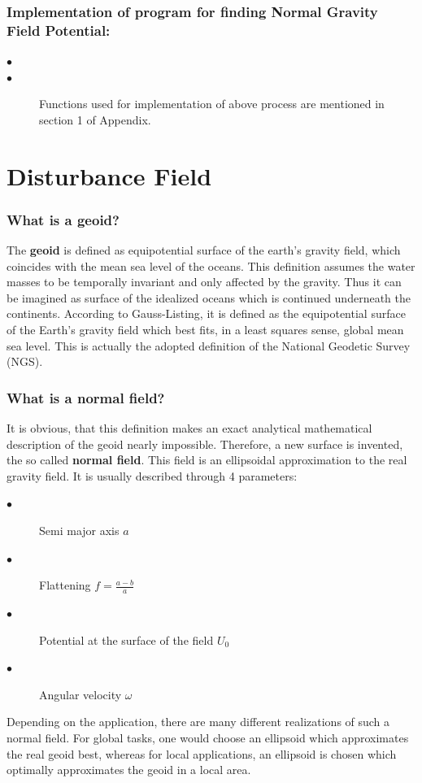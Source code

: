 \documentclass[a4paper,12pt]{report}
\begin{document}
\subsection{Implementation of program for finding Normal Gravity Field Potential:}
\begin{description}
\item[$\bullet$]
\item[$\bullet$]Functions used for implementation of above process are mentioned in section 1 of Appendix.
\end{description}   

\newpage
\chapter{Disturbance Field}
\subsection{What is a  geoid?}
The \textbf{geoid} is defined as equipotential surface of the earth’s gravity field, which coincides with the mean sea level of the oceans. This definition assumes the water masses to be temporally invariant and only affected by the gravity. Thus it can be imagined as surface of the idealized oceans which is continued underneath the continents. According to Gauss-Listing, it is defined as the equipotential surface of the Earth’s gravity field which best fits, in a least squares sense, global mean sea level. This is actually the adopted definition of the National Geodetic Survey (NGS).\\

\subsection{What is a normal field?}
It is obvious, that this definition makes an exact analytical mathematical description of the geoid nearly impossible. Therefore, a new surface is invented, the so called \textbf{normal field}. This field is an ellipsoidal approximation to the real gravity field. It is usually described through 4 parameters:
\begin{description}
\item[$\bullet$]Semi major axis $a$
\item[$\bullet$]Flattening $f=\frac{a-b}{a}$
\item[$\bullet$]Potential at the surface of the field $U_0$
\item[$\bullet$]Angular velocity $\omega$
\end{description}
Depending on the application, there are many different realizations of such a normal field. For global tasks, one would choose an ellipsoid which approximates the real geoid
best, whereas for local applications, an ellipsoid is chosen which optimally approximates the geoid in a local area.\\
\end{document}

